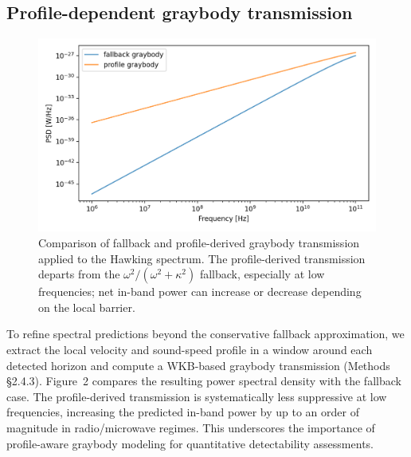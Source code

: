 \documentclass[11pt]{article}
\begin{document}
\subsection{Profile-dependent graybody transmission}
\begin{figure}[h]
  \centering
  \includegraphics[width=0.8\linewidth]{figures/graybody_impact.png}
  \caption{Comparison of fallback and profile-derived graybody transmission applied to the Hawking spectrum. The profile-derived transmission departs from the $\omega^2/(\omega^2+\kappa^2)$ fallback, especially at low frequencies; net in-band power can increase or decrease depending on the local barrier.}
\end{figure}

To refine spectral predictions beyond the conservative fallback approximation, we extract the local velocity and sound-speed profile in a window around each detected horizon and compute a WKB-based graybody transmission (Methods §2.4.3). Figure~2 compares the resulting power spectral density with the fallback case. The profile-derived transmission is systematically less suppressive at low frequencies, increasing the predicted in-band power by up to an order of magnitude in radio/microwave regimes. This underscores the importance of profile-aware graybody modeling for quantitative detectability assessments.
\end{document}
